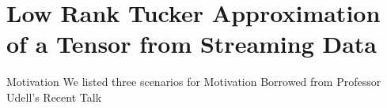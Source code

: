 \documentclass[handout,xcolor={usenames,dvipsnames}]{beamer}
\begin{document}
\section{Low Rank Tucker Approximation of a Tensor from Streaming Data}


\begin{frame}{Motivation}
We listed three scenarios for Motivation Borrowed from Professor Udell's Recent Talk
\end{frame}


\newcommand{\stream}{$\T{X}^{(t)} = \T{H}_1 + \cdots + \T{H}_t$}
\newcommand{\all}{$\T{X}^{(T)} = \T{H}_1 + \cdots + \T{H}_T$}
\newcommand{\db}{$\T{X} = \T{H}_1 + \cdots + \T{H}_T$}
\newcommand{\tapx}{$\hat{\T{X}}$}
\newcommand{\skstream}{$\mathcal L(\T{X}^{(t)}) = \mathcal L(\T{H}_1 + \cdots + \T{H}_{t-1}) + \mathcal L(\T{H}_t)$}
\newcommand{\skall}{$= \mathcal L(\T{H}_1 + \cdots + \T{H}_{T-1}) + \mathcal L(\T{H}_T)$}
\newcommand{\skdb}{$\mathcal L(\T{X}) = \mathcal L(\T{H}_1) + \cdots + \mathcal L(\T{H}_T)$}
\newcommand{\skx}{$\mathcal L(\T{X})$}
\newcommand{\skxt}{$\mathcal L(\T{X}^{(T)})$}
\newcommand{\x}{$\T{X}$}
\end{document}
